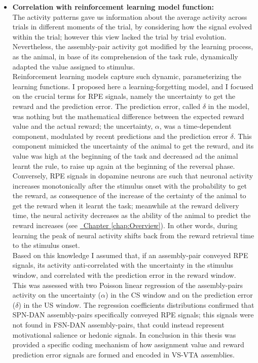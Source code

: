 \begin{itemize}
    \item \textbf{Correlation with reinforcement learning model function:}\\The activity patterns gave us information about the average activity across trials in different moments of the trial, by considering how the signal evolved within the trial; however this view lacked the trial by trial evolution. Nevertheless, the assembly-pair activity got modified by the learning process, as the animal, in base of its comprehension of the task rule, dynamically adapted the value assigned to stimulus.\\Reinforcement learning models capture such dynamic, parameterizing the learning functions. I proposed here a learning-forgetting model, and I focused on the crucial terms for RPE signals, namely the uncertainty to get the reward and the prediction error. The prediction error, called $\delta$ in the model, was nothing but the mathematical difference between the expected reward value and the actual reward; the uncertainty, $\alpha$, was a time-dependent component, modulated by recent predictions and the prediction error $\delta$. This component mimicked the uncertainty of the animal to get the reward, and its value was high at the beginning of the task and decreased ad the animal learnt the rule, to raise up again at the beginning of the reversal phase.\\Conversely, RPE signals in dopamine neurons are such that neuronal activity increases monotonically after the stimulus onset with the probability to get the reward, as consequence of the increase of the certainty of the animal to get the reward when it learnt the task; meanwhile at the reward delivery time, the neural activity decreases as the ability of the animal to predict the reward increases (see \hyperref[chap:Overview]{~Chapter \ref*{chap:Overview}}). In other words, during learning the peak of neural activity shifts back from the reward retrieval time to the stimulus onset.\\Based on this knowledge I assumed that, if an assembly-pair conveyed RPE signals, its activity anti-correlated with the uncertainty in the stimulus window, and correlated with the prediction error in the reward window.\\This was assessed with two Poisson linear regression of the assembly-pairs activity on the uncertainty ($\alpha$) in the CS window and on the prediction error ($\delta$) in the US window. The regression coefficients distributions confirmed that SPN-DAN assembly-pairs specifically conveyed RPE signals; this signals were not found in FSN-DAN assembly-pairs, that could instead represent motivational salience or hedonic signals. In conclusion in this thesis was provided a specific coding mechanism of how assignment value and reward prediction error signals are formed and encoded in VS-VTA assemblies. 
\end{itemize}
  